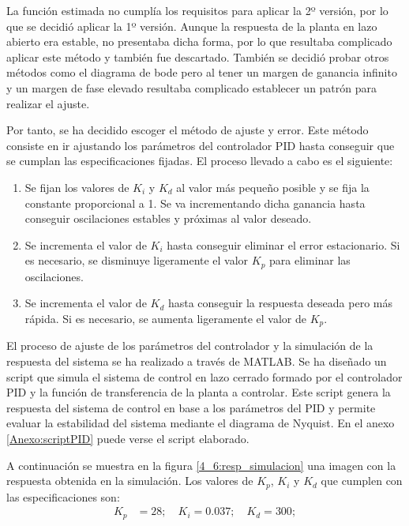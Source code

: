 	La función estimada no cumplía los requisitos para aplicar la 2º versión, por lo que se decidió aplicar la 1º versión. Aunque la respuesta de la planta en lazo abierto era estable, no presentaba dicha forma, por lo que resultaba complicado aplicar este método y también fue descartado. También se decidió probar otros métodos como el diagrama de bode pero al tener un margen de ganancia infinito y un margen de fase elevado resultaba complicado establecer un patrón para realizar el ajuste.

	Por tanto, se ha decidido escoger el método de ajuste y error. Este método consiste en ir ajustando los parámetros del controlador PID hasta conseguir que se cumplan las especificaciones fijadas. El proceso llevado a cabo es el siguiente:

\begin{enumerate}
	\item Se fijan los valores de $ K_{i}$ y $K_{d}$ al valor más pequeño posible y se fija la constante proporcional a 1. Se va incrementando dicha ganancia hasta conseguir oscilaciones estables y próximas al valor deseado.
	\item Se incrementa el valor de $K_{i}$ hasta conseguir eliminar el error estacionario. Si es necesario, se disminuye ligeramente el valor $K_{p}$ para eliminar las oscilaciones.  
	\item Se incrementa el valor de $K_{d}$ hasta conseguir la respuesta deseada pero más rápida. Si es necesario, se aumenta ligeramente el valor de $K_{p}$.
\end{enumerate}

	El proceso de ajuste de los parámetros del controlador y la simulación de la respuesta del sistema se ha realizado a través de MATLAB. Se ha diseñado un script que simula el sistema de control en lazo cerrado formado por el controlador PID y la función de transferencia de la planta a controlar. Este script genera la respuesta del sistema de control en base a los parámetros del PID y permite evaluar la estabilidad del sistema mediante el diagrama de Nyquist.  En el anexo \ref{Anexo:scriptPID} puede verse el script elaborado.

	A continuación se muestra en la figura \ref{4_6:resp_simulacion} una imagen con la respuesta obtenida en la simulación. Los valores de $K_{p}$, $K_{i}$ y $ K_{d}$ que cumplen con las especificaciones son:
\begin{align*}
	K_{p} &= 28; \quad K_{i}=0.037; \quad K_{d}= 300;
\end{align*}

